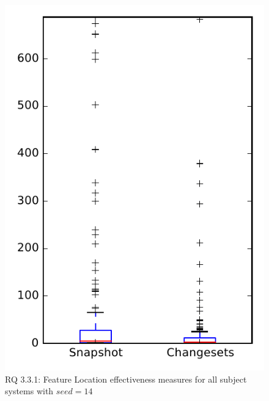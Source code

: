 
\begin{figure}
\centering
\includegraphics[height=0.4\textheight]{figures/flt_seed/rq1_overview_14}
\caption{RQ 3.3.1: Feature Location effectiveness measures for all subject systems with $seed=14$}
\label{fig:flt_seed:rq1:overview}
\end{figure}
